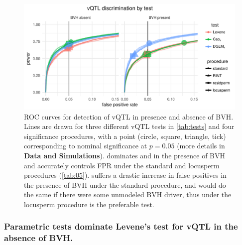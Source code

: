 \begin{figure}
  \centering
  \includegraphics[width = \linewidth]{images/simple_rocs_vqtl_all_facet_by_bvh.pdf}
  \caption[
    ROC curves for detection of vQTL in presence and absence of BVH. 
  ]
  {
    ROC curves for detection of vQTL in presence and absence of BVH. 
    Lines are drawn for three different vQTL tests in \autoref{tab:tests} and four significance procedures, with a point (circle, square, triangle, tick) corresponding to nominal significance at $p=0.05$ (more details in \textbf{Data and Simulations}).
    \DGLMv dominates \Caov and \Lev in the presence of BVH and accurately controls FPR under the standard and locusperm procedures (\autoref{tab:05}).
    \Caov suffers a drastic increase in false positives in the presence of BVH under the standard procedure, and \DGLMv would do the same if there were some unmodeled BVH driver, thus \DGLMv under the locusperm procedure is the preferable test.
  }
  \label{fig:roc_vqtl}
\end{figure}

\subsubsection{Parametric tests dominate Levene's test for vQTL in the absence of BVH.}

